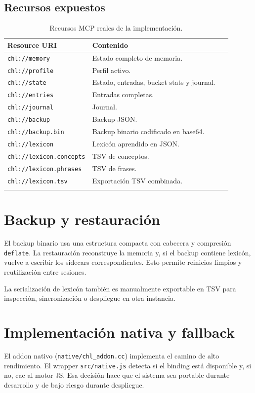 \documentclass[11pt]{article}
\newcommand{\MCP}{\textsc{MCP}}
\begin{document}
\subsection{Recursos expuestos}

\begin{longtable}{p{0.28\linewidth}p{0.62\linewidth}}
\toprule
\textbf{Resource URI} & \textbf{Contenido} \\
\midrule
\texttt{chl://memory} & Estado completo de memoria. \\
\texttt{chl://profile} & Perfil activo. \\
\texttt{chl://state} & Estado, entradas, bucket stats y journal. \\
\texttt{chl://entries} & Entradas completas. \\
\texttt{chl://journal} & Journal. \\
\texttt{chl://backup} & Backup JSON. \\
\texttt{chl://backup.bin} & Backup binario codificado en base64. \\
\texttt{chl://lexicon} & Lexicón aprendido en JSON. \\
\texttt{chl://lexicon.concepts} & TSV de conceptos. \\
\texttt{chl://lexicon.phrases} & TSV de frases. \\
\texttt{chl://lexicon.tsv} & Exportación TSV combinada. \\
\bottomrule
\caption{Recursos \MCP{} reales de la implementación.}
\end{longtable}

\section{Backup y restauración}

El backup binario usa una estructura compacta con cabecera y compresión \texttt{deflate}. La restauración reconstruye la memoria y, si el backup contiene lexicón, vuelve a escribir los sidecars correspondientes. Esto permite reinicios limpios y reutilización entre sesiones.

La serialización de lexicón también es manualmente exportable en TSV para inspección, sincronización o despliegue en otra instancia.

\section{Implementación nativa y fallback}

El addon nativo (\texttt{native/chl\_addon.cc}) implementa el camino de alto rendimiento. El wrapper \texttt{src/native.js} detecta si el binding está disponible y, si no, cae al motor JS. Esa decisión hace que el sistema sea portable durante desarrollo y de bajo riesgo durante despliegue.
\end{document}

